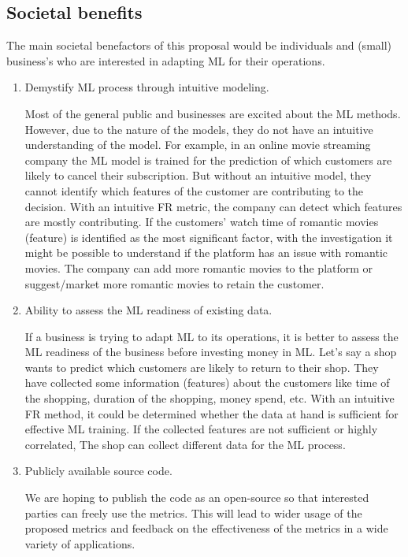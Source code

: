 \subsection{Societal benefits}
The main societal benefactors of this proposal would be individuals and (small) business's who are interested in adapting ML for their operations.
\begin{enumerate}
    \item Demystify ML process through intuitive modeling.
    
    Most of the general public and businesses are excited about the ML methods. However, due to the  nature of the models, they do not have an intuitive understanding of the model. For example, in an online movie streaming company the ML model is trained for the prediction of which customers are likely to cancel their subscription. But without an intuitive model, they cannot identify which features of the customer are contributing to the decision.  With an intuitive FR metric, the company can detect which features are mostly contributing. If the customers' watch time of romantic movies (feature)  is identified as the most significant factor, with the investigation it might be possible to understand if the platform has an issue with romantic movies. The company can add more romantic movies to the platform or suggest/market more romantic movies to retain the customer.
    
    \item Ability to assess the ML readiness of existing data.
    
    If a business is trying to adapt ML to its operations, it is better to assess the ML readiness of the business before investing money in ML\@. Let's say a shop wants to predict which customers are likely to return to their shop. They have collected some information (features) about the customers like time of the shopping, duration of the shopping, money spend, etc. With an intuitive FR method, it could be determined whether the data at hand is sufficient for effective ML training. If the collected features are not sufficient or highly correlated, The shop can collect different data for the ML process. 
    
    \item Publicly available source code.
    
    We are hoping to publish the code as an open-source so that interested parties can freely use the metrics. This will lead to wider usage of the proposed metrics and feedback on the effectiveness of the metrics in a wide variety of applications.

\end{enumerate}
\newpage



\newpage


% 
